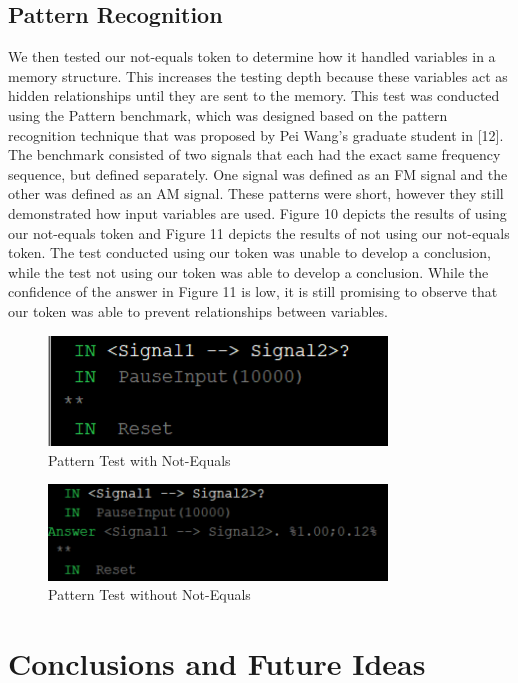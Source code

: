 \documentclass[conference]{IEEEtran}
\begin{document}
\subsection{Pattern Recognition}
	We then tested our not-equals token to determine how it handled variables in a memory structure. This increases the testing depth because these variables act as hidden relationships until they are sent to the memory. This test was conducted using the Pattern benchmark, which was designed based on the pattern recognition technique that was proposed by Pei Wang's graduate student in [12]. The benchmark consisted of two signals that each had the exact same frequency sequence, but defined separately. One signal was defined as an FM signal and the other was defined as an AM signal. These patterns were short, however they still demonstrated how input variables are used. Figure 10 depicts the results of using our not-equals token and Figure 11 depicts the results of not using our not-equals token. The test conducted using our token was unable to develop a conclusion, while the test not using our token was able to develop a conclusion. While the confidence of the answer in Figure 11 is low, it is still promising to observe that our token was able to prevent relationships between variables.
	
\begin{figure}[ht!]
\centering
\includegraphics[width=90mm]{PatW.png}
\caption{Pattern Test with Not-Equals \label{overflow}}
\end{figure}	

\begin{figure}[ht!]
\centering
\includegraphics[width=90mm]{PatWo.png}
\caption{Pattern Test without Not-Equals \label{overflow}}
\end{figure}	
	

\section{Conclusions and Future Ideas}
\end{document}

